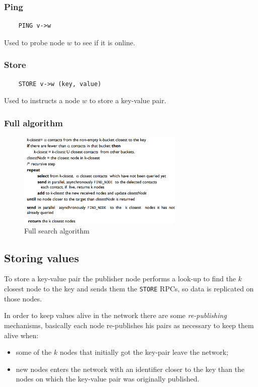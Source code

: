 \subsubsection{Ping}
\begin{verbatim}
    PING v->w
\end{verbatim}
Used to probe node $w$ to see if it is online.

\subsubsection{Store}
\begin{verbatim}
    STORE v->w (key, value)
\end{verbatim}
Used to instructs a node $w$ to store a key-value pair.

\subsubsection{Full algorithm}
\begin{figure}[H]
    \centering
    \includegraphics[width=300px]{images/3_DHT/07.png}
    \caption{Full search algorithm}
\end{figure}

\subsection{Storing values}
To store a key-value pair the publisher node performs a look-up to find the $k$ closest node to the key and sends them the \verb|STORE| RPCs, so data is replicated on those nodes.

In order to keep values alive in the network there are some \emph{re-publishing} mechanisms, basically each node re-publishes his pairs as necessary to keep them alive when:
\begin{itemize}
    \item some of the $k$ nodes that initially got the key-pair leave the network;
    \item new nodes enters the network with an identifier closer to the key than the nodes on which the key-value pair was originally published.
\end{itemize}

